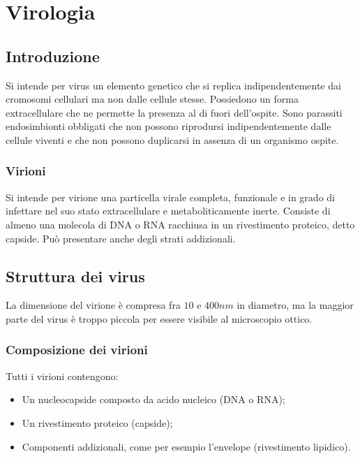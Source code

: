 \chapter{Virologia}

\section{Introduzione}
Si intende per virus un elemento genetico che si replica indipendentemente dai cromosomi cellulari ma non dalle cellule stesse.
Possiedono un forma extracellulare che ne permette la presenza al di fuori dell'ospite.
Sono parassiti endosimbionti obbligati che non possono riprodursi indipendentemente dalle cellule viventi e che non possono duplicarsi in assenza di un organismo ospite.

	\subsection{Virioni}
	Si intende per virione una particella virale completa, funzionale e in grado di infettare nel suo stato extracellulare e metaboliticamente inerte.
	Consiste di almeno una molecola di DNA o RNA racchiusa in un rivestimento proteico, detto capside. 
	Pu\`o presentare anche degli strati addizionali. 

\section{Struttura dei virus}
La dimensione del virione \`e compresa fra $10$ e $400\si{nm}$ in diametro, ma la maggior parte del virus \`e troppo piccola per essere visibile al microscopio ottico.

	\subsection{Composizione dei virioni}
	Tutti i virioni contengono:
	\begin{multicols}{2}
		\begin{itemize}
    			\item Un nucleocapside composto da acido nucleico (DNA o RNA);
    			\item Un rivestimento proteico (capside);
    			\item Componenti addizionali, come per esempio l'envelope (rivestimento lipidico).
		\end{itemize}
	\end{multicols}	

